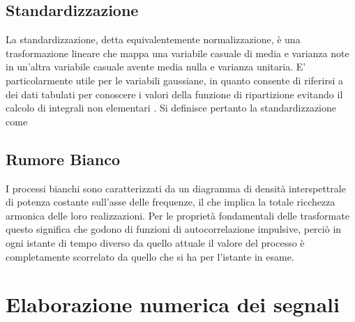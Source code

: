 	\subsection{Standardizzazione}
La standardizzazione, detta equivalentemente normalizzazione, è una trasformazione lineare che mappa una variabile casuale   di media e varianza note  in un'altra variabile casuale  avente media nulla e varianza unitaria. E' particolarmente utile per le variabili gaussiane, in quanto consente di riferirsi a dei dati tabulati per conoscere i valori della funzione di ripartizione evitando il calcolo di integrali non elementari \cite{WIKI}. Si definisce pertanto la standardizzazione come 
	\subsection{Rumore Bianco}
I processi bianchi sono caratterizzati da un diagramma di densità interspettrale di potenza costante sull'asse delle frequenze, il che implica la totale ricchezza armonica delle loro realizzazioni. Per le proprietà fondamentali delle trasformate questo significa che godono di funzioni di autocorrelazione impulsive, perciò in ogni istante di tempo diverso da quello attuale il valore del processo è completamente scorrelato da quello che si ha per l'istante in esame.
\section{Elaborazione numerica dei segnali}	%
